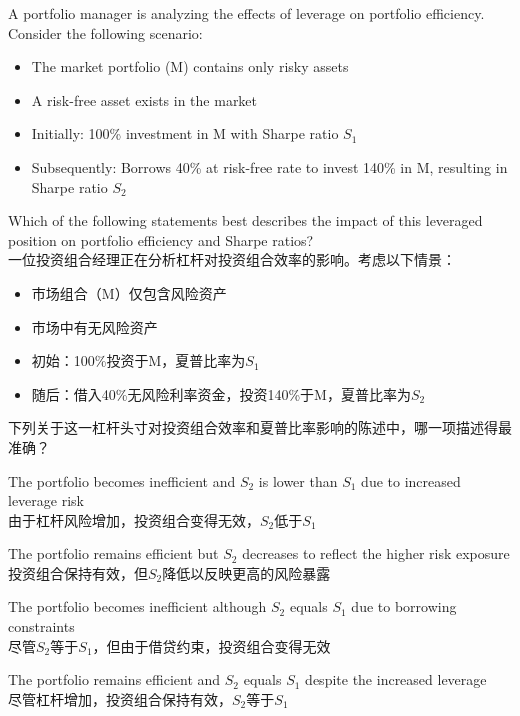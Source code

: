 \documentclass{article}
\newcounter{question} %
\begin{document}
\begin{question}
    A portfolio manager is analyzing the effects of leverage on portfolio efficiency. Consider the following scenario:
    \begin{itemize}
        \item The market portfolio (M) contains only risky assets
        \item A risk-free asset exists in the market
        \item Initially: 100\% investment in M with Sharpe ratio $S_1$
        \item Subsequently: Borrows 40\% at risk-free rate to invest 140\% in M, resulting in Sharpe ratio $S_2$
    \end{itemize}

    Which of the following statements best describes the impact of this leveraged position on portfolio efficiency and Sharpe ratios?\\
    一位投资组合经理正在分析杠杆对投资组合效率的影响。考虑以下情景：
    \begin{itemize}
        \item 市场组合（M）仅包含风险资产
        \item 市场中有无风险资产
        \item 初始：100\%投资于M，夏普比率为$S_1$
        \item 随后：借入40\%无风险利率资金，投资140\%于M，夏普比率为$S_2$
    \end{itemize}
    下列关于这一杠杆头寸对投资组合效率和夏普比率影响的陈述中，哪一项描述得最准确？
\end{question}

\begin{choices}
    \item The portfolio becomes inefficient and $S_2$ is lower than $S_1$ due to increased leverage risk\\
    由于杠杆风险增加，投资组合变得无效，$S_2$低于$S_1$
    
    \item The portfolio remains efficient but $S_2$ decreases to reflect the higher risk exposure
    \\
    投资组合保持有效，但$S_2$降低以反映更高的风险暴露
    \item The portfolio becomes inefficient although $S_2$ equals $S_1$ due to borrowing constraints
    \\
    尽管$S_2$等于$S_1$，但由于借贷约束，投资组合变得无效
    \item The portfolio remains efficient and $S_2$ equals $S_1$ despite the increased leverage
    \\
    尽管杠杆增加，投资组合保持有效，$S_2$等于$S_1$
\end{choices}
\end{document}
